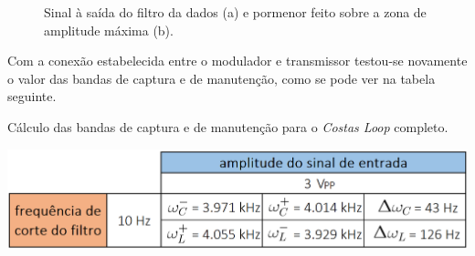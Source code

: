 \documentclass[11pt]{article}
\numberwithin{equation}{section}
\begin{document}
\begin{figure}[H]
	\centering
	\hspace{8mm}
	\vspace{-0.8em}
	\caption{Sinal à saída do filtro da dados (a) e pormenor feito sobre a zona de amplitude máxima (b).}
	\label{fig:out1}
	\vspace{-0.8em}
\end{figure}


Com a conexão estabelecida entre o modulador e transmissor testou-se novamente o valor das bandas de captura e de manutenção, como se pode ver na tabela seguinte.

\begin{table}[H]
	\centering
	\caption{Cálculo das bandas de captura e de manutenção para o \textit{Costas Loop} completo.}
	\vspace{-1.5mm}
	\includegraphics[keepaspectratio=true, scale=0.35]{tabelas/bandascompleto}
\end{table}
\end{document}
